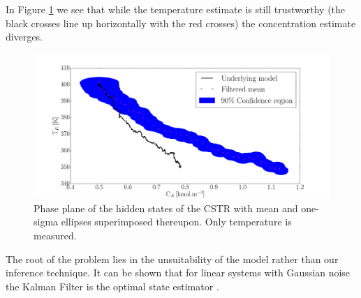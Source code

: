 \documentclass[../masters.tex]{subfiles}
\begin{document}
In Figure \ref{fig_kfphase} we see that while the temperature estimate is still trustworthy (the black crosses line up horizontally with the red crosses) the concentration estimate diverges.
\begin{figure}[H] 
\centering
\includegraphics[scale=0.30]{kalman_filter_phase_M1.pdf}
\caption{Phase plane of the hidden states of the CSTR with mean and one-sigma ellipses superimposed thereupon. Only temperature is measured.}
\label{fig_kfphase}
\end{figure}
The root of the problem lies in the unsuitability of the model rather than our inference technique. It can be shown that for linear systems with Gaussian noise the Kalman Filter is the optimal state estimator \cite{shalom}. 
\end{document}
